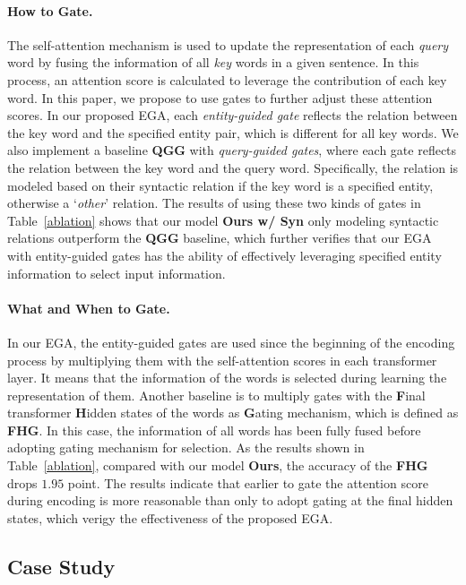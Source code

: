 \documentclass[11pt]{article}
\begin{document}
\paragraph{How to Gate.}
The self-attention mechanism is used to update the representation of each \textit{query} word by fusing the information of all \textit{key} words in a given sentence.
In this process, an attention score is calculated to leverage the contribution of each key word.
In this paper, we propose to use gates to further adjust these attention scores.
In our proposed EGA, each \textit{entity-guided gate} reflects the relation between the key word and the specified entity pair, which is different for all key words.
We also implement a baseline \textbf{QGG} with \textit{query-guided gates}, where each gate reflects the relation between the key word and the query word.
Specifically, the relation is modeled based on their syntactic relation if the key word is a specified entity, otherwise a `\textit{other}' relation.
The results of using these two kinds of gates in Table~\ref{ablation} shows that our model \textbf{Ours w/ Syn} only modeling syntactic relations outperform the \textbf{QGG} baseline, which further verifies that our EGA with entity-guided gates has the ability of effectively leveraging specified entity information to select input information.

\paragraph{What and When to Gate.}
In our EGA, the entity-guided gates are used since the beginning of the encoding process by multiplying them with the self-attention scores in each transformer layer.
It means that the information of the words is selected during learning the representation of them.
Another baseline is to multiply gates with the \textbf{F}inal transformer \textbf{H}idden states of the words as \textbf{G}ating mechanism, which is defined as \textbf{FHG}.
In this case, the information of all words has been fully fused before adopting gating mechanism for selection.
As the results shown in Table~\ref{ablation}, compared with our model \textbf{Ours}, the accuracy of the \textbf{FHG} drops $1.95$ point.
The results indicate that earlier to gate the attention score during encoding is more reasonable than only to adopt gating at the final hidden states, which verigy the effectiveness of the proposed EGA.




\subsection{Case Study}
\end{document}
